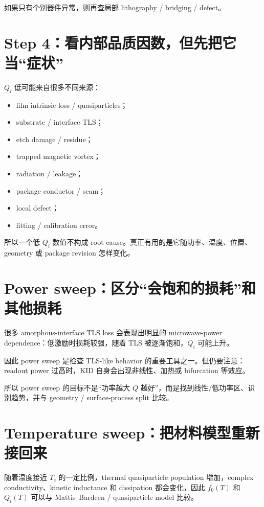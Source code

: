 如果只有个别器件异常，则再查局部 lithography / bridging / defect。

\section{Step 4：看内部品质因数，但先把它当“症状”}

$Q_i$ 低可能来自很多不同来源：

\begin{itemize}
  \item film intrinsic loss / quasiparticles；
  \item substrate / interface TLS；
  \item etch damage / residue；
  \item trapped magnetic vortex；
  \item radiation / leakage；
  \item package conductor / seam；
  \item local defect；
  \item fitting / calibration error。
\end{itemize}

所以一个低 $Q_i$ 数值不构成 root cause。真正有用的是它随功率、温度、位置、geometry 或 package revision 怎样变化。

\section{Power sweep：区分“会饱和的损耗”和其他损耗}

很多 amorphous-interface TLS loss 会表现出明显的 microwave-power dependence：低激励时损耗较强，随着 TLS 被逐渐饱和，$Q_i$ 可能上升。

因此 power sweep 是检查 TLS-like behavior 的重要工具之一。但仍要注意：readout power 过高时，KID 自身会出现非线性、加热或 bifurcation 等效应。

所以 power sweep 的目标不是“功率越大 $Q$ 越好”，而是找到线性/低功率区、识别趋势，并与 geometry / surface-process split 比较。

\section{Temperature sweep：把材料模型重新接回来}

随着温度接近 $T_c$ 的一定比例，thermal quasiparticle population 增加，complex conductivity、kinetic inductance 和 dissipation 都会变化，因此 $f_0(T)$ 和 $Q_i(T)$ 可以与 Mattis--Bardeen / quasiparticle model 比较。

